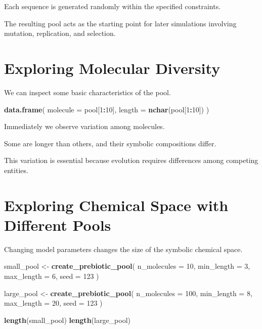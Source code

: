 \documentclass[
  oneside,
  openany]{book}
\newenvironment{Shaded}{\begin{snugshade}}{\end{snugshade}}
\newcommand{\AttributeTok}[1]{\textcolor[rgb]{0.13,0.29,0.53}{#1}}
\newcommand{\DecValTok}[1]{\textcolor[rgb]{0.00,0.00,0.81}{#1}}
\newcommand{\FunctionTok}[1]{\textcolor[rgb]{0.13,0.29,0.53}{\textbf{#1}}}
\newcommand{\NormalTok}[1]{#1}
\newcommand{\OtherTok}[1]{\textcolor[rgb]{0.56,0.35,0.01}{#1}}
\newcommand{\SpecialCharTok}[1]{\textcolor[rgb]{0.81,0.36,0.00}{\textbf{#1}}}
\begin{document}
Each sequence is generated randomly within the specified constraints.

The resulting pool acts as the starting point for later simulations involving mutation, replication, and selection.

\section{Exploring Molecular Diversity}\label{exploring-molecular-diversity}

We can inspect some basic characteristics of the pool.

\begin{Shaded}
\begin{Highlighting}[]
\FunctionTok{data.frame}\NormalTok{(}
  \AttributeTok{molecule =}\NormalTok{ pool[}\DecValTok{1}\SpecialCharTok{:}\DecValTok{10}\NormalTok{],}
  \AttributeTok{length =} \FunctionTok{nchar}\NormalTok{(pool[}\DecValTok{1}\SpecialCharTok{:}\DecValTok{10}\NormalTok{])}
\NormalTok{)}
\end{Highlighting}
\end{Shaded}

Immediately we observe variation among molecules.

Some are longer than others, and their symbolic compositions differ.

This variation is essential because evolution requires differences among competing entities.

\section{Exploring Chemical Space with Different Pools}\label{exploring-chemical-space-with-different-pools}

Changing model parameters changes the size of the symbolic chemical space.

\begin{Shaded}
\begin{Highlighting}[]
\NormalTok{small\_pool }\OtherTok{\textless{}{-}} \FunctionTok{create\_prebiotic\_pool}\NormalTok{(}
  \AttributeTok{n\_molecules =} \DecValTok{10}\NormalTok{,}
  \AttributeTok{min\_length =} \DecValTok{3}\NormalTok{,}
  \AttributeTok{max\_length =} \DecValTok{6}\NormalTok{,}
  \AttributeTok{seed =} \DecValTok{123}
\NormalTok{)}

\NormalTok{large\_pool }\OtherTok{\textless{}{-}} \FunctionTok{create\_prebiotic\_pool}\NormalTok{(}
  \AttributeTok{n\_molecules =} \DecValTok{100}\NormalTok{,}
  \AttributeTok{min\_length =} \DecValTok{8}\NormalTok{,}
  \AttributeTok{max\_length =} \DecValTok{20}\NormalTok{,}
  \AttributeTok{seed =} \DecValTok{123}
\NormalTok{)}

\FunctionTok{length}\NormalTok{(small\_pool)}
\FunctionTok{length}\NormalTok{(large\_pool)}
\end{Highlighting}
\end{Shaded}
\end{document}
